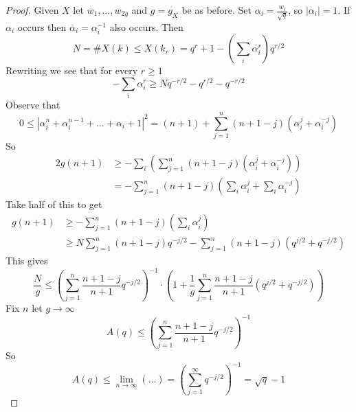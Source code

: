 \begin{proof}
Given $X$ let $w_1, \ldots, w_{2g}$ and $g = g_X$ be as before. Set
$\alpha_i = \frac{w_i}{\sqrt{q}}$, so $|\alpha_i| = 1$. If $\alpha_i$
occurs then $\overline{\alpha}_i = \alpha_i^{-1}$ also occurs. Then
$$
N = \# X(k) \leq X(k_r) = q^r + 1 - (\sum_i \alpha_i^r) q^{r/2}
$$
Rewriting we see that for every $r \geq 1$
$$
-\sum_i \alpha_i^r \geq Nq^{-r/2} - q^{r/2} - q^{-r/2}
$$
Observe that
$$
0 \leq |\alpha_i^n +\alpha_i^{n-1} +\ldots +\alpha_i +1|^2
= (n + 1) + \sum_{j = 1}^n (n + 1 - j) (\alpha_i^j + \alpha_i^{-j})
$$
So
\begin{align*}
2g(n+1) & \geq - \sum_i \left(\sum_{j = 1}^n (n+1-j)(\alpha_i^j
+\alpha_i^{-j})\right)\\
& =-\sum_{j = 1}^n (n+1-j)\left(\sum_i\alpha_i^j
+\sum_i\alpha_i^{-j}\right)
\end{align*}
Take half of this to get
\begin{align*}
g(n+1)& \geq - \sum_{j = 1}^n (n+1-j)(\sum_i\alpha_i^j)\\
& \geq N\sum_{j = 1}^n (n+1-j)q^{-j/2}-\sum_{j = 1}^n
(n+1-j)(q^{j/2}+q^{-j/2})
\end{align*}
This gives
$$
\frac{N}{g}\leq \left(\sum_{j = 1}^n \frac{n+1-j}{n+1}q^{-j/2} \right)^{-1}
\cdot
\left(
1 + \frac{1}{g} \sum_{j = 1}^n \frac{n + 1 - j}{n + 1}(q^{j/2} + q^{-j/2})
\right)
$$
Fix $n$ let $g\to \infty$
$$
A(q)\leq \left(\sum_{j = 1}^n \frac{n+1-j}{n+1}q^{-j/2}\right)^{-1}
$$
So
$$
A(q)\leq \lim_{n\to\infty}(\ldots) = \left(\sum_{j = 1}^\infty
q^{-j/2}\right)^{-1}=\sqrt{q}-1
$$
\end{proof}











